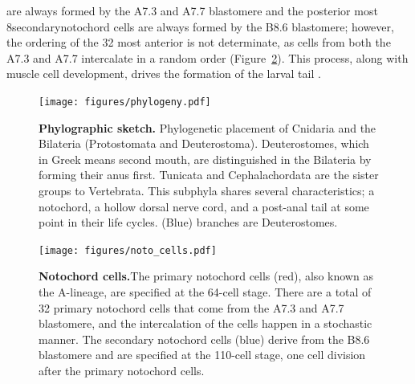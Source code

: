 are always formed by the A7.3 and A7.7 blastomere and the posterior most 8\textemdash secondary\textemdash notochord cells are always formed by the B8.6 blastomere; however, the ordering of the 32 most anterior is not determinate, as cells from both the A7.3 and A7.7 intercalate in a random order (Figure~\ref{fig:noto_cells})\cite{nishida_cell_1983,nishida_cell_1985,miyamoto_formation_1985, swalla_mechanisms_1993,kourakis_one-dimensional_2014}. This process, along with muscle cell development, drives the formation of the larval tail \cite{miyamoto_formation_1985, jeffery_factors_1992,swalla_mechanisms_1993}.
\begin{figure}[tbp]
\centering
\texttt{[image: figures/phylogeny.pdf]}

\caption{\textbf{Phylographic sketch.} Phylogenetic placement of Cnidaria and the Bilateria (Protostomata and Deuterostoma). Deuterostomes, which in Greek means second mouth, are distinguished in the Bilateria by forming their anus first. Tunicata and Cephalachordata are the sister groups to Vertebrata. This subphyla shares several characteristics; a notochord, a hollow dorsal nerve cord, and a post-anal tail at some point in their life cycles. (Blue) branches are Deuterostomes.}
\label{fig:phylog}
\end{figure}

\begin{figure}[thbp]
\centering
\texttt{[image: figures/noto\_cells.pdf]}
\caption{\textbf{Notochord cells.}The primary notochord cells (red), also known as the A-lineage, are specified at the 64-cell stage. There are a total of 32 primary notochord cells that come from the A7.3 and A7.7 blastomere, and the intercalation of the cells happen in a stochastic manner. The secondary notochord cells (blue) derive from the B8.6 blastomere and are specified at the 110-cell stage, one cell division after the primary notochord cells.}
\label{fig:noto_cells}
\end{figure}

